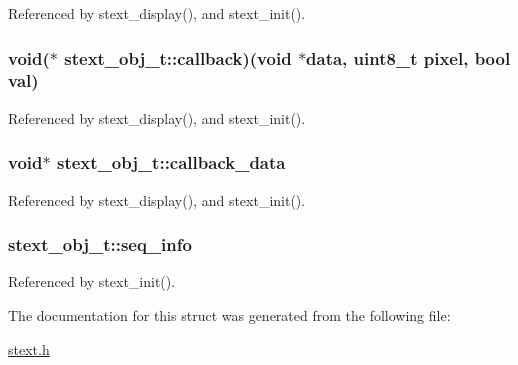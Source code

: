 Referenced by stext\_\-display(), and stext\_\-init().\hypertarget{structstext__obj__t_c28da1d989570019bf9072c187473c66}{
\subsubsection{\setlength{\rightskip}{0pt plus 5cm}void($\ast$ {\bf stext\_\-obj\_\-t::callback})(void $\ast$data, uint8\_\-t pixel, bool val)}}
\label{structstext__obj__t_c28da1d989570019bf9072c187473c66}




Referenced by stext\_\-display(), and stext\_\-init().\hypertarget{structstext__obj__t_e8c5066481a3f52cf54dd91f747e736d}{
\subsubsection{\setlength{\rightskip}{0pt plus 5cm}void$\ast$ {\bf stext\_\-obj\_\-t::callback\_\-data}}}
\label{structstext__obj__t_e8c5066481a3f52cf54dd91f747e736d}




Referenced by stext\_\-display(), and stext\_\-init().\hypertarget{structstext__obj__t_04b57a99ef50849f9316b8ad9d6a5cac}{
\subsubsection{ {\bf stext\_\-obj\_\-t::seq\_\-info}}}
\label{structstext__obj__t_04b57a99ef50849f9316b8ad9d6a5cac}




Referenced by stext\_\-init().

The documentation for this struct was generated from the following file:\begin{CompactItemize}
\item 
\hyperlink{stext_8h}{stext.h}\end{CompactItemize}
